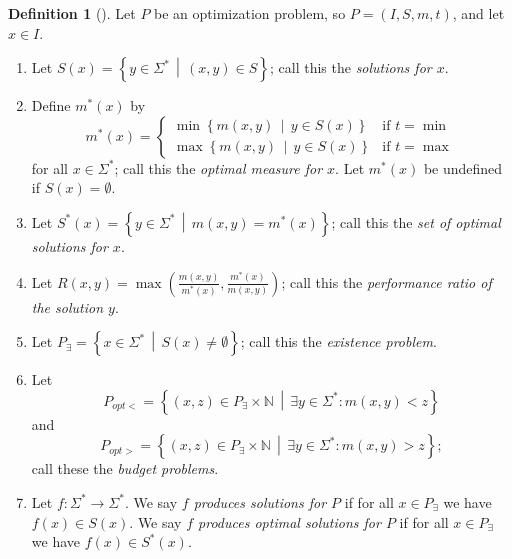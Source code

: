 \documentclass[draft]{article}
\theoremstyle{definition}
\newtheorem{definition}{Definition}
\newcommand{\lb}{\left\{}
\newcommand{\rb}{\right\}}
\newcommand{\st}{\,\middle|\,}
\begin{document}
\begin{definition}[\cite{tantau07}]
  Let $P$ be an optimization problem, so $P=(I, S, m, t)$, and let $x\in I$.
  \begin{enumerate}
  \item Let $S(x)=\lb y\in\Sigma^* \st (x, y)\in S \rb$; call this the \emph{solutions for $x$}.
  \item Define $m^*(x)$ by
    \begin{displaymath}
      m^*(x) =
      \begin{cases}
        \min \lb m(x, y) \st y\in S(x) \rb & \text{if } t = \min \\
        \max \lb m(x, y) \st y\in S(x) \rb & \text{if } t = \max
      \end{cases}
    \end{displaymath}
    for all $x\in \Sigma^*$; call this the \emph{optimal measure for $x$}.
    Let $m^*(x)$ be undefined if $S(x)=\emptyset$.
  \item Let $S^*(x)=\lb y\in\Sigma^* \st m(x, y) = m^*(x) \rb$; call this the \emph{set of optimal solutions for $x$}.
  \item Let $R(x, y)=\max\left( \frac{m(x, y)}{m^*(x)}, \frac{m^*(x)}{m(x, y)} \right)$; call this the \emph{performance ratio of the solution $y$}.
  \item Let $P_\exists = \lb x\in \Sigma^* \st S(x) \neq \emptyset \rb$; call this the \emph{existence problem}.
  \item Let
    \begin{displaymath}
      P_{opt<}=\lb (x, z) \in P_\exists\times\mathbb{N} \st \exists y\in\Sigma^*\colon m(x, y) < z \rb
    \end{displaymath}
    and
    \begin{displaymath}
      P_{opt>}=\lb (x, z) \in P_\exists\times\mathbb{N} \st \exists y\in\Sigma^*\colon m(x, y) > z \rb;
    \end{displaymath}
    call these the \emph{budget problems}.
  \item Let $f\colon \Sigma^*\to\Sigma^*$.
    We say \emph{$f$ produces solutions for $P$} if for all $x\in P_\exists$ we have $f(x)\in S(x)$.
    We say \emph{$f$ produces optimal solutions for $P$} if for all $x\in P_\exists$ we have $f(x)\in S^*(x)$.
  \end{enumerate}
\end{definition}
\end{document}
